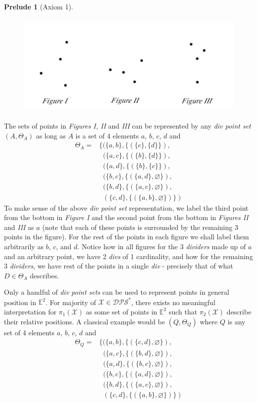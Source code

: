 \documentclass[11pt, oneside]{article}      %
\theoremstyle{definition}
\numberwithin{equation}{section}
\theoremstyle{c}
\newtheorem*{prelude}{Prelude}
\begin{document}
\begin{prelude}[Axiom 1]
\begin{figure}[b]
\centering
\includegraphics[height=5cm]{figures_1_2_3.jpg}
\end{figure}

The sets of points in \textit{Figures I, II} and \textit{III} can be represented by any \textit{div point set} $(A, \Theta_A)$ as long as $A$ is a set of 4 elements $a$, $b$, $c$, $d$ and
\begin{align*}
    \Theta_{A} = & \{(\{a,b\},\{(\{c\},\{d\}\}), \\
    &\;\; (\{a,c\},\{(\{b\},\{d\}\}), \\
    &\;\; (\{a,d\},\{(\{b\},\{c\}\}), \\
    &\;\; (\{b,c\}, \{(\{a,d\},\varnothing\}), \\
    &\;\; (\{b,d\},\{(\{a,c\},\varnothing\}), \\
    &\;\; (\{c,d\}, \{(\{a,b\},\varnothing\})\})
\end{align*}
To make sense of the above \textit{div point set} representation, we label the third point from the bottom in \textit{Figure I} and the second point from the bottom in \textit{Figures II} and \textit{III} as $a$ (note that each of these points is surrounded by the remaining 3 points in the figure). For the rest of the points in each figure we shall label them arbitrarily as $b$, $c$, and $d$. Notice how in all figures for the 3 \textit{dividers} made up of $a$ and an arbitrary point, we have 2 \textit{divs} of 1 cardinality, and how for the remaining 3 \textit{dividers}, we have rest of the points in a single \textit{div}  - precisely that of what $D \in \Theta_A$ describes.

Only a handful of \textit{div point sets} can be used to represent points in general position in $\mathbb{E}^2$. For majority of $\mathscr{X} \in \mathscr{DPS}^*$, there exists no meaningful interpretation for $\pi_1(\mathscr{X})$ as some set of points in $\mathbb{E}^2$ such that $\pi_2(\mathscr{X})$ describe their relative positions. A classical example would be $(Q, \Theta_Q)$ where $Q$ is any set of 4 elements $a$, $b$, $c$, $d$ and
\begin{align*}
    \Theta_{Q} = & \{(\{a,b\},\{(\{c,d\},\varnothing\}), \\
    &\;\; (\{a,c\},\{(\{b,d\},\varnothing\}), \\
    &\;\; (\{a,d\},\{(\{b,c\},\varnothing\}), \\
    &\;\; (\{b,c\}, \{(\{a,d\},\varnothing\}), \\
    &\;\; (\{b,d\},\{(\{a,c\},\varnothing\}), \\
    &\;\; (\{c,d\}, \{(\{a,b\},\varnothing\})\})
\end{align*}


\end{prelude}
\end{document}
